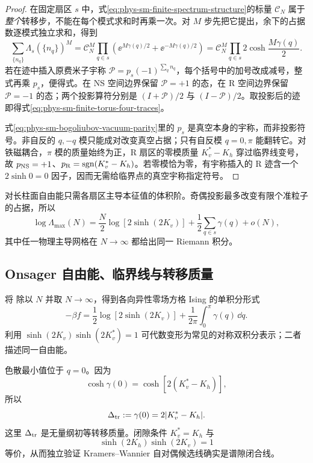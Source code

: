\begin{proof}
在固定扇区 \(s\) 中，式\cref{eq:phys-sm-finite-spectrum-structure}的标量 \(\mathcal C_N\) 属于\emph{整个}转移步，不能在每个模式求和时再乘一次。对 \(M\) 步先把它提出，余下的占据数逐模式独立求和，得到
\[
\sum_{\{n_q\}}\Lambda_s(\{n_q\})^M
=\mathcal C_N^M
\prod_{q\in s}
\left(\ee^{M\gamma(q)/2}+\ee^{-M\gamma(q)/2}\right)
=\mathcal C_N^M\prod_{q\in s}2\cosh\frac{M\gamma(q)}2.
\]
若在迹中插入原费米子宇称 \(\mathcal P=p_s(-1)^{\sum_qn_q}\)，每个括号中的加号改成减号，整式再乘 \(p_s\)，便得式。在 NS 空间边界保留 \(\mathcal P=+1\) 的态，在 R 空间边界保留 \(\mathcal P=-1\) 的态；两个投影算符分别是 \((I+\mathcal P)/2\) 与 \((I-\mathcal P)/2\)。取投影后的迹即得式\cref{eq:phys-sm-finite-torus-four-traces}。

式\cref{eq:phys-sm-bogoliubov-vacuum-parity}里的 \(p_s\) 是真空本身的宇称，而非投影符号。非自反的 \(q,-q\) 模只能成对改变真空占据；只有自反模 \(q=0,\pi\) 能翻转它。对铁磁耦合，\(\pi\) 模的质量始终为正，R 扇区的零模质量 \(K_v^*-K_h\) 穿过临界线变号，故 \(p_{\rm NS}=+1\)、\(p_{\rm R}=\operatorname{sgn}(K_v^*-K_h)\)。若零模恰为零，有宇称插入的 R 迹含一个 \(2\sinh0=0\) 因子，因而无需给临界点的真空宇称指定符号。
\end{proof}

对长柱面自由能只需各扇区主导本征值的体积阶。奇偶投影最多改变有限个准粒子的占据，所以
\begin{equation}
 \log\Lambda_{\max}(N)
 =\frac N2\log[2\sinh(2K_v)]
 +\frac12\sum_{q\in s}\gamma(q)+o(N),
 \label{eq:phys-sm-lambda-max-finite}
\end{equation}
其中任一物理主导网格在 \(N\to\infty\) 都给出同一 Riemann 积分。

\subsection{Onsager 自由能、临界线与转移质量}

将 除以 \(N\) 并取 \(N\to\infty\)，得到各向异性零场方格 Ising 的单积分形式
\begin{equation}
 -\beta f
 =\frac12\log[2\sinh(2K_v)]
 +\frac{1}{2\pi}\int_0^\pi\gamma(q)\,\dd q.
 \label{eq:phys-sm-onsager-standard}
\end{equation}
利用 \(\sinh(2K_v)\sinh(2K_v^*)=1\) 可代数变形为常见的对称双积分表示；二者描述同一自由能。

色散最小值位于 \(q=0\)。因为
\[
 \cosh\gamma(0)
 =\cosh[2(K_v^*-K_h)],
\]
所以
\begin{equation}
 \Delta_{\rm tr}:=\gamma(0)=2|K_v^*-K_h|.
 \label{eq:phys-sm-gapclose}
\end{equation}
这里 \(\Delta_{\rm tr}\) 是无量纲初等转移质量。闭隙条件 \(K_v^*=K_h\) 与
\begin{equation}
 \sinh(2K_h)\sinh(2K_v)=1
 \label{eq:phys-sm-critical-line}
\end{equation}
等价，从而独立验证 Kramers--Wannier 自对偶候选线确实是谱隙闭合线。

